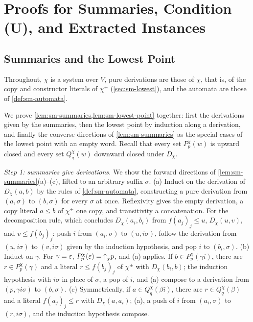 
\section{Proofs for Summaries, Condition (U), and Extracted Instances}\label{app:sm}

\subsection{Summaries and the Lowest Point}\label{app:sm-summaries}

Throughout, $\chi$ is a system over $V$, pure derivations are those of
$\chi$, that is, of the copy and constructor literals of $\chi^\pm$
(\cref{sec:sm-lowest}), and the automata are those of \cref{def:sm-automata}.

We prove \cref{lem:sm-summaries,lem:sm-lowest-point} together: first the
derivations given by the summaries, then the lowest point by induction along a
derivation, and finally the converse directions of \cref{lem:sm-summaries} as
the special cases of the lowest point with an empty word. Recall that every
set $P^\chi_p(w)$ is upward closed and every set $Q^\chi_q(w)$ downward closed
under $D_\chi$.

\emph{Step 1: summaries give derivations.} We show the forward directions of
\cref{lem:sm-summaries}(a)--(c), lifted to an arbitrary suffix $\sigma$. (a)
Induct on the derivation of $D_\chi(a,b)$ by the rules of
\cref{def:sm-automata}, constructing a pure derivation from $(a,\sigma)$ to
$(b,\sigma)$ for every $\sigma$ at once. Reflexivity gives the empty
derivation, a copy literal $a\le b$ of $\chi^\pm$ one copy, and transitivity a
concatenation. For the decomposition rule, which concludes $D_\chi(a_i,b_i)$
from $f(a_j)_j\le u$, $D_\chi(u,v)$, and $v\le f(b_j)_j$: push $i$ from
$(a_i,\sigma)$ to $(u,i\sigma)$, follow the derivation from $(u,i\sigma)$ to
$(v,i\sigma)$ given by the induction hypothesis, and pop $i$ to $(b_i,\sigma)$.
(b) Induct on $\gamma$. For $\gamma=\varepsilon$, $P^\chi_p(\varepsilon)=\mathord{\uparrow}_{\chi} p$, and (a)
applies. If $b\in P^\chi_p(\gamma i)$, there are $r\in P^\chi_p(\gamma)$ and a
literal $r\le f(b_j)_j$ of $\chi^\pm$ with $D_\chi(b_i,b)$; the induction
hypothesis with $i\sigma$ in place of $\sigma$, a pop of $i$, and (a) compose to
a derivation from $(p,\gamma i\sigma)$ to $(b,\sigma)$. (c) Symmetrically, if
$a\in Q^\chi_q(\beta i)$, there are $r\in Q^\chi_q(\beta)$ and a literal
$f(a_j)_j\le r$ with $D_\chi(a,a_i)$; (a), a push of $i$ from $(a_i,\sigma)$ to
$(r,i\sigma)$, and the induction hypothesis compose.

